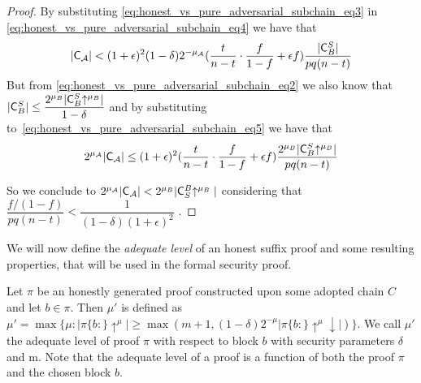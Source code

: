 \begin{proof}
	By substituting \ref{eq:honest_vs_pure_adversarial_subchain_eq3} in \ref{eq:honest_vs_pure_adversarial_subchain_eq4} we have that
	\begin{equation}\label{eq:honest_vs_pure_adversarial_subchain_eq5}
		\lvert \mathsf{C}_\mathcal{A} \rvert < (1+\epsilon)^2(1-\delta)2^{-\mu_\mathcal{A}}( \dfrac{t}{n-t} \cdot \dfrac{f}{1-f} + \epsilon f) \dfrac{\lvert \mathsf{C}^S_B \rvert}{pq(n-t)}
	\end{equation}
	But from \ref{eq:honest_vs_pure_adversarial_subchain_eq2} we also know that $ \lvert \mathsf{C}_{B}^S \rvert \leq \dfrac{2^{\mu_B}\lvert \mathsf{C}_{B}^S \negthickspace\uparrow^{\mu_B} \rvert}{1- \delta}$ and by substituting to~\ref{eq:honest_vs_pure_adversarial_subchain_eq5} we have that 
	\begin{equation}
		2^{\mu_\mathcal{A}} \lvert \mathsf{C}_\mathcal{A} \rvert \leq (1+\epsilon)^2 ( \dfrac{t}{n-t} \cdot \dfrac{f}{1-f} + \epsilon f) \dfrac{2^{\mu_B}\lvert \mathsf{C}^S_B \negthickspace\uparrow^{\mu_B} \rvert}{pq(n-t)}
	\end{equation}

	So we conclude to $2^{\mu_\mathcal{A}} \vert \mathsf{C}_\mathcal{A} \vert
	<  2^{\mu_B} \vert    \mathsf{C}^{B}_{S}\negthickspace\uparrow^{\mu_B}\vert $ considering that $\dfrac{f/(1-f)}{pq(n-t)} < \dfrac{1}{(1-\delta)(1+\epsilon)^2}$ .
\end{proof}

We will now define the \emph{adequate level} of an honest suffix proof and some resulting properties, that will be used in the formal security proof.

\begin{defn}
	Let $\pi$ be an
	honestly generated proof constructed upon some adopted chain $C$ and let $b \in 
	\pi $. Then $\mu'$ is defined as $\mu' = \max \{ \mu: \vert \pi\{b:\}\uparrow^{\mu}
	\vert \geq \max( m+1, (1-\delta)2^{-\mu} \vert \pi\{b:\}\uparrow^{\mu}\downarrow \vert )\}$.
	We call $\mu'$ the adequate level of proof $\pi$ with respect to block $b$ with
	security parameters $\delta$ and m. Note that the adequate level of a proof is a
	function of both the proof $\pi$ and the chosen block $b$.
\end{defn}


